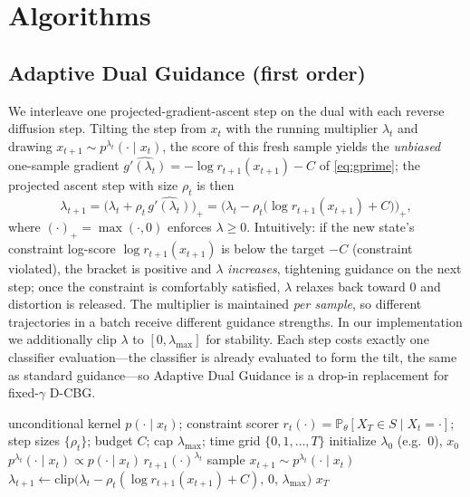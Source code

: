 \documentclass{article}
\begin{document}
\section{Algorithms}
\label{sec:algorithms}

\subsection{Adaptive Dual Guidance (first order)}
We interleave one projected-gradient-ascent step on the dual with each reverse diffusion step. Tilting the step from $x_t$ with the running multiplier $\lambda_t$ and drawing $x_{t+1}\sim p^{\lambda_t}(\cdot\mid x_t)$, the score of this fresh sample yields the \emph{unbiased} one-sample gradient $\widehat{g'(\lambda_t)}=-\log r_{t+1}(x_{t+1})-C$ of \eqref{eq:gprime}; the projected ascent step with size $\rho_t$ is then
\begin{equation}
\label{eq:lambda-update}
\lambda_{t+1}=\Big(\lambda_t+\rho_t\,\widehat{g'(\lambda_t)}\Big)_{+}
=\Big(\lambda_t-\rho_t\big(\log r_{t+1}(x_{t+1})+C\big)\Big)_{+},
\end{equation}
where $(\cdot)_+=\max(\cdot,0)$ enforces $\lambda\ge0$. Intuitively: if the new state's constraint log-score $\log r_{t+1}(x_{t+1})$ is below the target $-C$ (constraint violated), the bracket is positive and $\lambda$ \emph{increases}, tightening guidance on the next step; once the constraint is comfortably satisfied, $\lambda$ relaxes back toward $0$ and distortion is released. The multiplier is maintained \emph{per sample}, so different trajectories in a batch receive different guidance strengths. In our implementation we additionally clip $\lambda$ to $[0,\lambda_{\max}]$ for stability. Each step costs exactly one classifier evaluation---the classifier is already evaluated to form the tilt, the same as standard guidance---so Adaptive Dual Guidance is a drop-in replacement for fixed-$\gamma$ D-CBG.

\begin{algorithm}[t]
\caption{Adaptive Dual Guidance}
\label{alg:adg}
\begin{algorithmic}[1]
\Require unconditional kernel $p(\cdot\mid x_t)$; constraint scorer $r_t(\cdot)=\mathbb P_\theta[X_T\in S\mid X_t{=}\cdot]$; step sizes $\{\rho_t\}$; budget $C$; cap $\lambda_{\max}$; time grid $\{0,1,\dots,T\}$
\State initialize $\lambda_0$ (e.g.\ $0$), $x_0$
  \State $p^{\lambda_t}(\cdot\mid x_t)\propto p(\cdot\mid x_t)\,r_{t+1}(\cdot)^{\lambda_t}$ 
  \State sample $x_{t+1}\sim p^{\lambda_t}(\cdot\mid x_t)$
  \State $\lambda_{t+1}\gets \mathrm{clip}\big(\lambda_t-\rho_t(\log r_{t+1}(x_{t+1})+C),\,0,\,\lambda_{\max}\big)$ 
\EndFor
\State \Return $x_T$
\end{algorithmic}
\end{algorithm}
\end{document}
